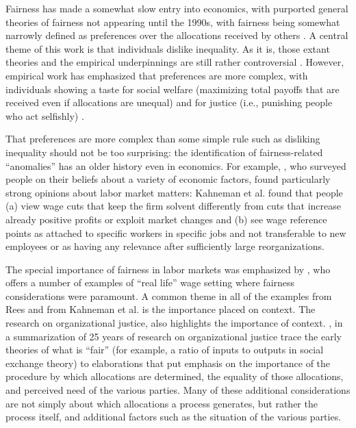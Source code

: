 \documentclass[11pt]{article}
\begin{document}
Fairness has made a somewhat slow entry into economics, with purported general theories of fairness not appearing until the 1990s, with fairness being somewhat narrowly defined as preferences over the allocations received by others \citep{fehr2000fairness, fehr1999theory, rabin1993incorporating}.
A central theme of this work is that individuals dislike inequality.
As it is, those extant theories and the empirical underpinnings are still rather controversial \citep{binmore2010experimental}.   
However, empirical work has emphasized that preferences are more complex, with individuals showing a taste for social welfare (maximizing total payoffs that are received even if allocations are unequal) and for justice (i.e., punishing people who act selfishly) \citep{charness2002understanding}. 

That preferences are more complex than some simple rule such as disliking inequality should not be too surprising: 
the identification of fairness-related ``anomalies'' has an older history even in economics.
For example, \cite{kahneman1986}, who surveyed people on their beliefs about a variety of economic factors, found particularly strong opinions about labor market matters:
Kahneman et al. found that people (a) view wage cuts that keep the firm solvent differently from cuts that increase already positive profits or exploit market changes and (b) see wage reference points as attached to specific workers in specific jobs and not transferable to new employees or as having any relevance after sufficiently large reorganizations.

The special importance of fairness in labor markets was emphasized by \cite{rees1993role}, who offers a number of examples of ``real life'' wage setting where fairness considerations were paramount.
A common theme in all of the examples from Rees and from Kahneman et al. is the importance placed on context. 
The research on organizational justice, also highlights the importance of context.
\cite{colquitt2001justice}, in a summarization of 25 years of research on organizational justice trace the early theories of what is ``fair'' (for example, a ratio of inputs to outputs in social exchange theory) to elaborations that put emphasis on the importance of the procedure by which allocations are determined, the equality of those allocations, and perceived need of the various parties.
Many of these additional considerations are not simply about which allocations a process generates, but rather the process itself, and additional factors such as the situation of the various parties.
 
\end{document}
